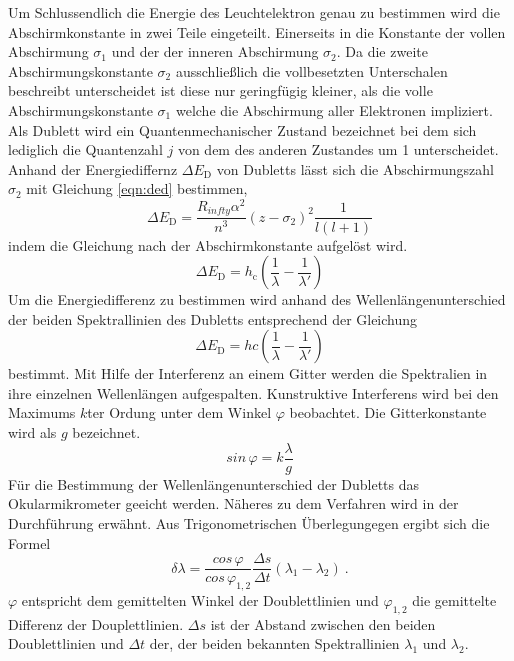 Um Schlussendlich die Energie des Leuchtelektron genau zu bestimmen wird die Abschirmkonstante in zwei Teile eingeteilt. Einerseits in die Konstante der vollen Abschirmung $\sigma_1$ und der der inneren Abschirmung $\sigma_2$. Da die zweite Abschirmungskonstante $\sigma_2$ ausschließlich die vollbesetzten Unterschalen beschreibt unterscheidet ist diese nur geringfügig kleiner, als die volle Abschirmungskonstante $\sigma_1$ welche die Abschirmung aller Elektronen  impliziert. Als Dublett wird ein Quantenmechanischer Zustand bezeichnet bei dem sich lediglich die Quantenzahl $j$ von dem des anderen Zustandes um 1 unterscheidet. Anhand der Energiediffernz $\Delta E_\text{D}$ von Dubletts lässt sich die Abschirmungszahl $\sigma_2$ mit Gleichung \eqref{eqn:ded} bestimmen,
\begin{equation}
  \Delta E_\text{D} = \frac{R_{infty} \alpha^2}{n^3} \left( z - \sigma_2 \right)^2 \frac{1}{l(l+1)}
  \label{eqn:ded}
\end{equation}
indem die Gleichung nach der Abschirmkonstante aufgelöst wird. 
\begin{equation}
  \Delta E_\text{D} = h_\text{c}\left( \frac{1}{\lambda} - \frac{1}{\lambda'} \right)
  \label{<++>}
\end{equation}
Um die Energiedifferenz zu bestimmen wird anhand des Wellenlängenunterschied der beiden Spektrallinien des Dubletts entsprechend der Gleichung
\begin{equation}
  \Delta E_\text{D} = hc\left( \frac{1}{\lambda} - \frac{1}{\lambda'} \right)
  \label{eqn:ed}
\end{equation}
bestimmt. 
Mit Hilfe der Interferenz an einem Gitter werden die Spektralien in ihre einzelnen Wellenlängen aufgespalten. Kunstruktive Interferens wird bei den Maximums $k$ter Ordung unter dem Winkel $\varphi$ beobachtet. Die Gitterkonstante wird als $g$ bezeichnet.
\begin{equation}
  sin \, \varphi = k \frac{\lambda}{g}
  \label{eqn:phi}
\end{equation}
Für die Bestimmung der Wellenlängenunterschied der Dubletts das Okularmikrometer geeicht werden. Näheres zu dem Verfahren wird in der Durchführung erwähnt. Aus Trigonometrischen Überlegungegen ergibt sich die Formel 
\begin{equation}
  \delta\lambda = \frac{cos \, \varphi}{cos \, \varphi_{1,2}} \frac{\Delta s}{\Delta t}\left( \lambda_1 - \lambda_2 \right) \ .
  \label{eqn:dlam}
\end{equation}
$\varphi$ entspricht dem gemittelten Winkel der Doublettlinien und $\varphi_{1,2}$ die gemittelte Differenz der Douplettlinien. $\Delta s$ ist der Abstand zwischen den beiden Doublettlinien und $\Delta t$ der, der beiden bekannten Spektrallinien $\lambda_1$ und $\lambda_2$.

